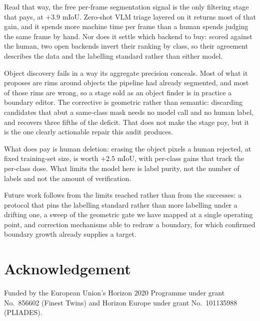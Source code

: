 \documentclass[journal]{IEEEtran}
\begin{document}
Read that way, the free per-frame segmentation signal is the only filtering stage that pays, at $+3.9$ mIoU.
Zero-shot VLM triage layered on it returns most of that gain, and it spends more machine time per frame than a human spends judging the same frame by hand.
Nor does it settle which backend to buy: scored against the human, two open backends invert their ranking by class, so their agreement describes the data and the labelling standard rather than either model.

Object discovery fails in a way its aggregate precision conceals.
Most of what it proposes are rims around objects the pipeline had already segmented, and most of those rims are wrong, so a stage sold as an object finder is in practice a boundary editor.
The corrective is geometric rather than semantic: discarding candidates that abut a same-class mask needs no model call and no human label, and recovers three fifths of the deficit.
That does not make the stage pay, but it is the one clearly actionable repair this audit produces.

What does pay is human deletion: erasing the object pixels a human rejected, at fixed training-set size, is worth $+2.5$ mIoU, with per-class gains that track the per-class dose.
What limits the model here is label purity, not the number of labels and not the amount of verification.

Future work follows from the limits reached rather than from the successes: a protocol that pins the labelling standard rather than more labelling under a drifting one, a sweep of the geometric gate we have mapped at a single operating point, and correction mechanisms able to redraw a boundary, for which confirmed boundary growth already supplies a target.

\section*{Acknowledgement}
Funded by the European Union's Horizon 2020 Programme under grant No.~856602 (Finest Twins) and Horizon Europe under grant No.~101135988 (PLIADES).



\end{document}
